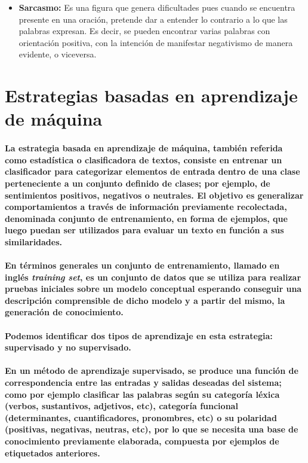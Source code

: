 \begin{itemize}
\item \textbf{Sarcasmo:} Es una figura que genera dificultades pues cuando se encuentra presente en una oraci\'on, pretende dar a entender lo contrario a lo que las palabras expresan. Es decir, se pueden encontrar varias palabras con orientaci\'on positiva, con la intenci\'on de manifestar negativismo de manera evidente, o viceversa.

\end{itemize}



\section{Estrategias basadas en aprendizaje de m\'aquina}
\paragraph{La estrategia basada en aprendizaje de m\'aquina, tambi\'en referida como estad\'istica o clasificadora de textos, consiste en entrenar un clasificador para categorizar elementos de entrada dentro de una clase perteneciente a un conjunto definido de clases; por ejemplo, de sentimientos positivos, negativos o neutrales. El objetivo es generalizar comportamientos a trav\'es de informaci\'on previamente recolectada, denominada conjunto de entrenamiento, en forma de ejemplos, que luego puedan ser utilizados para evaluar un texto en funci\'on a sus similaridades.}
\paragraph{En t\'erminos generales un conjunto de entrenamiento, llamado en ingl\'es \textit{training set}, es un conjunto de datos que se utiliza para realizar pruebas iniciales sobre un modelo conceptual esperando conseguir una descripci\'on comprensible de dicho modelo y a partir del mismo, la generaci\'on de conocimiento.}
\paragraph{Podemos identificar dos tipos de aprendizaje en esta estrategia: supervisado y no supervisado.}
\paragraph{En un m\'etodo de aprendizaje supervisado, se produce una funci\'on de correspondencia entre las entradas y salidas deseadas del sistema; como por ejemplo clasificar las palabras seg\'un su categor\'ia l\'exica (verbos, sustantivos, adjetivos, etc), categor\'ia funcional (determinantes, cuantificadores, pronombres, etc) o su polaridad (positivas, negativas, neutras, etc), por lo que se necesita una base de conocimiento previamente elaborada, compuesta por ejemplos de etiquetados anteriores.}
